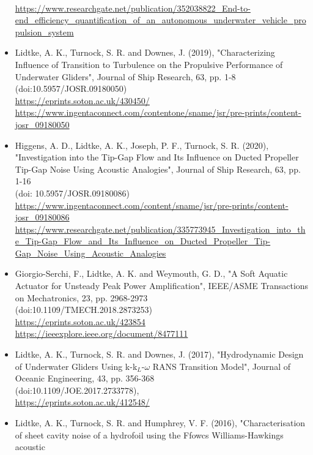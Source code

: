 \documentclass[a4paper,10pt]{article}
\begin{document}
\begin{itemize}
    \\ \url{https://www.researchgate.net/publication/352038822_End-to-end_efficiency_quantification_of_an_autonomous_underwater_vehicle_propulsion_system}
%
\item Lidtke, A. K., Turnock, S. R. and Downes, J. (2019),
	"Characterizing Influence of Transition to Turbulence on the Propulsive Performance of Underwater Gliders",
	Journal of Ship Research, 63, pp. 1-8
	\cite{Lidtke2019}
	\\ (doi:10.5957/JOSR.09180050)
	\\ \url{https://eprints.soton.ac.uk/430450/}
	\\ \url{https://www.ingentaconnect.com/contentone/sname/jsr/pre-prints/content-josr_09180050}
%
\item Higgens, A. D., Lidtke, A. K., Joseph, P. F., Turnock, S. R. (2020),
	"Investigation into the Tip-Gap Flow and Its Influence on Ducted Propeller Tip-Gap Noise Using Acoustic Analogies",
	Journal of Ship Research, 63, pp. 1-16
	\cite{Higgens2020}
	\\ (doi: 10.5957/JOSR.09180086)
	\\ \url{https://www.ingentaconnect.com/content/sname/jsr/pre-prints/content-josr_09180086}
	\\ \url{https://www.researchgate.net/publication/335773945_Investigation_into_the_Tip-Gap_Flow_and_Its_Influence_on_Ducted_Propeller_Tip-Gap_Noise_Using_Acoustic_Analogies}
%
\item Giorgio-Serchi, F., Lidtke, A. K. and Weymouth, G. D.,
	"A Soft Aquatic Actuator for Unsteady Peak Power Amplification",
	IEEE/ASME Transactions on Mechatronics, 23, pp. 2968-2973
	\cite{GiorgioSerchi2018}
	\\ (doi:10.1109/TMECH.2018.2873253)
	\\ \url{https://eprints.soton.ac.uk/423854}
	\\ \url{https://ieeexplore.ieee.org/document/8477111}
%
\item Lidtke, A. K., Turnock, S. R. and Downes, J. (2017),
	"Hydrodynamic Design of Underwater Gliders Using k-k$_L$-$\omega$ RANS Transition Model",
	Journal of Oceanic Engineering, 43, pp. 356-368
	\cite{Lidtke2017}
	\\ (doi:10.1109/JOE.2017.2733778),
	\\ \url{https://eprints.soton.ac.uk/412548/}
%
\item Lidtke, A. K., Turnock, S. R. and Humphrey, V. F. (2016), "Characterisation
	of sheet cavity noise of a hydrofoil using the Ffowcs Williams-Hawkings acoustic

\end{itemize}
\end{document}
